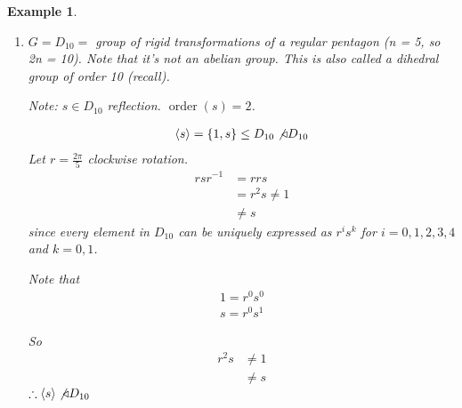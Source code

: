 \documentclass[11pt, oneside]{book}
\theoremstyle{break}
\newtheorem*{proof}{Proof}
\newtheorem*{note}{Note}
\newtheorem{eg}{Example}[section]
\DeclareMathOperator{\order}{order}
\begin{document}
\begin{eg}
\begin{enumerate}
                \begin{proof}
                    Let $a \in G$ and $b \in \ker(\phi)$
                    \begin{align*}
                        \phi(aba^{-1}) &= \phi(a)\phi(b)\phi(a)^{-1} \\
                            &= \phi(a)\phi(a)^{-1} \quad b \in \ker(\phi) \\
                            &= 1_H \quad \therefore aba^{-1} \in \ker(\phi)
                    \end{align*}
                    Thus we observe that $a\ker(\phi)a^{-1} \subseteq \ker(\phi)$. Therefore, $\ker(\phi) \triangleleft G$.
                \end{proof}

                \begin{note}
                    When $n \geq 3$ is even, $Z(D_{2n}) = \{1, r^{\frac{n}{2}} \}$.
                \end{note}

        \item $G = D_{10} = $ group of rigid transformations of a regular pentagon (n = 5, so 2n = 10). Note that it's not an abelian group. This is also called a dihedral group of order 10 (recall).

            Note: $s \in D_{10}$ reflection. $\order(s) = 2$.

            \begin{align*}
                \langle s \rangle = \{1, s\} \leq D_{10} \not\triangleleft D_{10}
            \end{align*}
            Let $r = \frac{2 \pi}{5}$ clockwise rotation.
            \begin{align*}
                rsr^{-1} &= rrs \\
                    &= r^2 s \neq 1 \\
                    &\neq s
            \end{align*}
            since every element in $D_{10}$ can be uniquely expressed as $r^i s^k$ for $i = 0, 1, 2, 3, 4$ and $k = 0, 1$.

            Note that
            \begin{gather*}
                1 = r^0 s^0 \\
                s = r^0 s^1
            \end{gather*}

            So
            \begin{align*}
                r^2s &\neq 1 \\
                    &\neq s
            \end{align*}
            $\therefore \langle s \rangle \not\triangleleft D_{10}$


\end{enumerate}
\end{eg}
\end{document}

